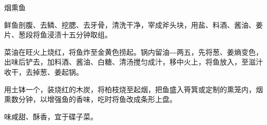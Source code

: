 \begin{recipe}{烟熏鱼}

\ingredients


\cooking

\step 鲜鱼剖腹、去鳞、挖腮、去牙骨，清洗干净，宰成斧头块，用盐、料酒、酱油、姜片、葱段将鱼浸渍十五分钟取组。

\step 菜油在旺火上烧红，将鱼炸至金黄色捞起。锅内留油―两五，先将葱、姜熵变色，出味后铲去，加料酒、酱油、白糖、清汤搅匀成汁，移中火上，将鱼放入，至滋汁收干，去掉葱、姜起锅。

\step 用土钵一个，装烧红的木炭，将柏枝烧至起烟，把鱼盛入筲箕或定制的熏笼内，烟熏数分钟，以增强鱼的香味，吃时将鱼改成条形上盘。

\notes

味咸甜、酥香，宜于碟子菜。

\end{recipe}

